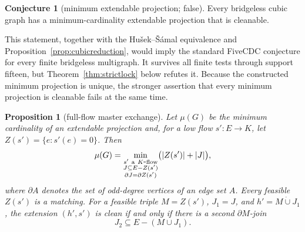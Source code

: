 \documentclass[11pt]{article}
\newtheorem{proposition}[theorem]{Proposition}
\theoremstyle{definition}
\newtheorem{conjecture}[theorem]{Conjecture}
\theoremstyle{remark}
\begin{document}
\begin{conjecture}[minimum extendable projection; false]\label{conj:minimum}
Every bridgeless cubic graph has a minimum-cardinality extendable
projection that is cleanable.
\end{conjecture}

This statement, together with the Hu\v{s}ek--\v{S}\'amal equivalence and
Proposition~\ref{prop:cubicreduction}, would imply the standard FiveCDC
conjecture for every finite bridgeless multigraph.  It survives all
finite tests through support fifteen, but
Theorem~\ref{thm:strictlock} below refutes it.  Because the constructed
minimum projection is unique, the stronger assertion that every minimum
projection is cleanable fails at the same time.

\begin{proposition}[full-flow master exchange]\label{prop:fullmaster}
Let \(\mu(G)\) be the minimum cardinality of an extendable projection and,
for a low flow \(s':E\to K\), let \(Z(s')=\{e:s'(e)=0\}\).  Then
\[
 \mu(G)=
 \min_{\substack{s'\ {\rm a}\ K{\rm\mbox{-}flow}\\
                  J\subseteq E-Z(s')\\
                  \partial J=\partial Z(s')}}
       \bigl(|Z(s')|+|J|\bigr),
\]
where \(\partial A\) denotes the set of odd-degree vertices of an edge
set \(A\).  Every feasible \(Z(s')\) is a matching.  For a feasible
triple \(M=Z(s')\), \(J_1=J\), and
\(h'=M\mathbin{\dot\cup}J_1\), the extension \((h',s')\) is clean if and
only if there is a second \(\partial M\)-join
\[
                     J_2\subseteq E-(M\cup J_1).
\]
\end{proposition}
\end{document}
